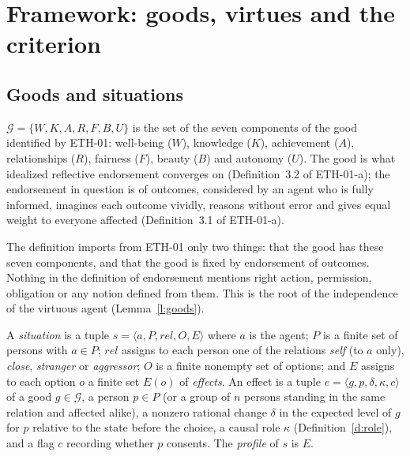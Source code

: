 \documentclass{situationist-preprint}
\newcommand{\Good}{\mathcal{G}}
\begin{document}
\section{Framework: goods, virtues and the criterion}\label{s:framework}

\subsection{Goods and situations}

\begin{definition}[Goods]\label{d:goods}
$\Good = \{W, K, A, R, F, B, U\}$ is the set of the seven components of the good identified by ETH-01: well-being ($W$), knowledge ($K$), achievement ($A$), relationships ($R$), fairness ($F$), beauty ($B$) and autonomy ($U$). The good is what idealized reflective endorsement converges on (Definition~3.2 of ETH-01-a); the endorsement in question is of outcomes, considered by an agent who is fully informed, imagines each outcome vividly, reasons without error and gives equal weight to everyone affected (Definition~3.1 of ETH-01-a).
\end{definition}

The definition imports from ETH-01 only two things: that the good has these seven components, and that the good is fixed by endorsement of outcomes. Nothing in the definition of endorsement mentions right action, permission, obligation or any notion defined from them. This is the root of the independence of the virtuous agent (Lemma~\ref{l:goods}).

\begin{definition}[Situation]\label{d:situation}
A \emph{situation} is a tuple $s=\langle a, P, \mathit{rel}, O, E\rangle$ where $a$ is the agent; $P$ is a finite set of persons with $a\in P$; $\mathit{rel}$ assigns to each person one of the relations \emph{self} (to $a$ only), \emph{close}, \emph{stranger} or \emph{aggressor}; $O$ is a finite nonempty set of options; and $E$ assigns to each option $o$ a finite set $E(o)$ of \emph{effects}. An effect is a tuple $e=\langle g, p, \delta, \kappa, c\rangle$ of a good $g\in\Good$, a person $p\in P$ (or a group of $n$ persons standing in the same relation and affected alike), a nonzero rational change $\delta$ in the expected level of $g$ for $p$ relative to the state before the choice, a causal role $\kappa$ (Definition~\ref{d:role}), and a flag $c$ recording whether $p$ consents. The \emph{profile} of $s$ is $E$.
\end{definition}
\end{document}
